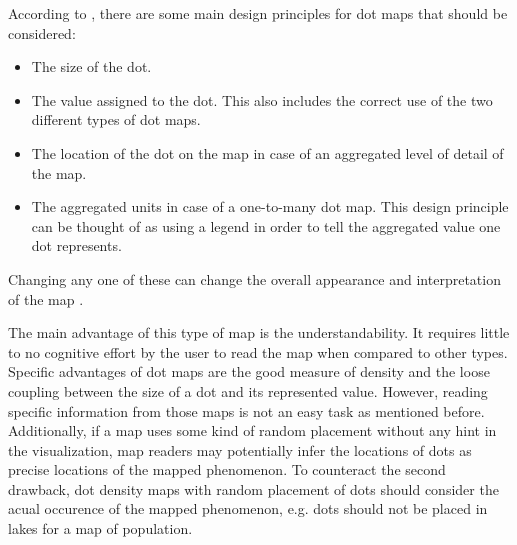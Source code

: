 According to \citeauthor{Tyner2010}, there are some main design principles for dot maps that should be considered:
\begin{itemize}
\item The size of the dot.
\item The value assigned to the dot. This also includes the correct use of the two different types of dot maps.
\item The location of the dot on the map in case of an aggregated level of detail of the map.
\item The aggregated units in case of a one-to-many dot map. This design principle can be thought of as using a legend in order to tell the aggregated value one dot represents.
\end{itemize}
Changing any one of these can change the overall appearance and interpretation of the map .

The main advantage of this type of map is the understandability. It requires little to no cognitive effort by the user to read the map when compared to other types. Specific advantages of dot maps are the good measure of density and the loose coupling between the size of a dot and its represented value.
However, reading specific information from those maps is not an easy task as mentioned before. Additionally, if a map uses some kind of random placement without any hint in the visualization, map readers may potentially infer the locations of dots as precise locations of the mapped phenomenon. To counteract the second drawback, dot density maps with random placement of dots should consider the acual occurence of the mapped phenomenon, e.g. dots should not be placed in lakes for a map of population.